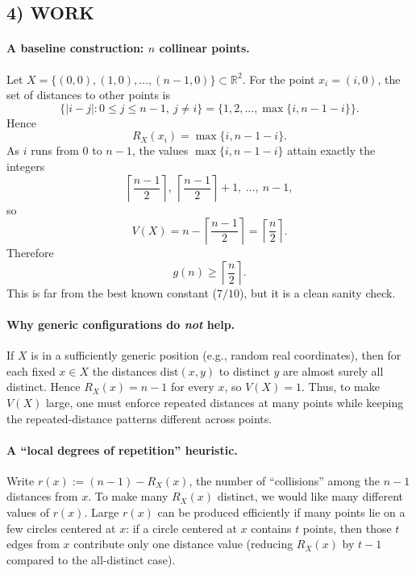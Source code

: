 \subsection*{4) WORK}

\paragraph{A baseline construction: $n$ collinear points.}
Let $X=\{(0,0),(1,0),\dots,(n-1,0)\}\subset\mathbb{R}^2$.
For the point $x_i=(i,0)$, the set of distances to other points is
\[
\{\left\lvert i-j \right\rvert:0\le j\le n-1,\ j\ne i\}=\{1,2,\dots,\max\{i,n-1-i\}\}.
\]
Hence
\[
R_X(x_i)=\max\{i,n-1-i\}.
\]
As $i$ runs from $0$ to $n-1$, the values $\max\{i,n-1-i\}$ attain exactly the integers
\[
\left\lceil\frac{n-1}{2}\right\rceil,\ \left\lceil\frac{n-1}{2}\right\rceil+1,\ \dots,\ n-1,
\]
so
\[
V(X)=n-\left\lceil\frac{n-1}{2}\right\rceil=\left\lceil\frac{n}{2}\right\rceil.
\]
Therefore
\begin{equation}\label{eq:gn_half}
 g(n)\ge \left\lceil\frac{n}{2}\right\rceil.
\end{equation}
This is far from the best known constant ($7/10$), but it is a clean sanity check.

\paragraph{Why generic configurations do \emph{not} help.}
If $X$ is in a sufficiently generic position (e.g., random real coordinates), then for each fixed $x\in X$ the distances $\mathrm{dist}(x,y)$ to distinct $y$ are almost surely all distinct.
Hence $R_X(x)=n-1$ for every $x$, so $V(X)=1$.
Thus, to make $V(X)$ large, one must enforce repeated distances at many points while keeping the repeated-distance patterns different across points.

\paragraph{A ``local degrees of repetition'' heuristic.}
Write $r(x):=(n-1)-R_X(x)$, the number of ``collisions'' among the $n-1$ distances from $x$.
To make many $R_X(x)$ distinct, we would like many different values of $r(x)$.
Large $r(x)$ can be produced efficiently if many points lie on a few circles centered at $x$:
if a circle centered at $x$ contains $t$ points, then those $t$ edges from $x$ contribute only one distance value (reducing $R_X(x)$ by $t-1$ compared to the all-distinct case).

